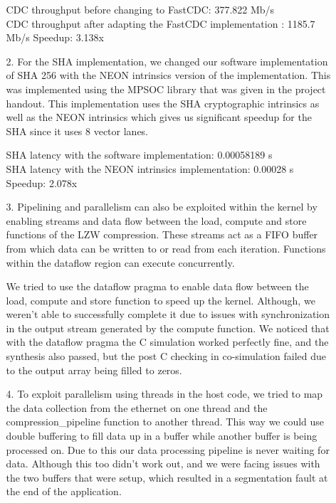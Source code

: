 \documentclass[../main.tex]{subfiles}
\begin{document}
\begin{enumerate}
\begin{enumerate}
        CDC throughput before changing to FastCDC: 377.822 Mb/s \\
        CDC throughput after adapting the FastCDC implementation : 1185.7 Mb/s
        Speedup: 3.138x

        \item[2.] For the SHA implementation, we changed our software implementation of SHA 256 with the NEON intrinsics version of the implementation. This was implemented using the MPSOC library that was given in the project handout. This implementation uses the SHA cryptographic intrinsics as well as the NEON intrinsics which gives us significant speedup for the SHA since it uses 8 vector lanes. 

        SHA latency with the software implementation: 0.00058189 s \\
        SHA latency with the NEON intrinsics implementation: 0.00028 s \\
        Speedup: 2.078x

        \item[3.] Pipelining and parallelism can also be exploited within the kernel by enabling streams and data flow between the load, compute and store functions of the LZW compression. These streams act as a FIFO buffer from which data can be written to or read from each iteration. Functions within the dataflow region can execute concurrently. 

        We tried to use the dataflow pragma to enable data flow between the load, compute and store function to speed up the kernel. Although, we weren’t able to successfully complete it due to issues with synchronization in the output stream generated by the compute function. We noticed that with the dataflow pragma the C simulation worked perfectly fine, and the synthesis also passed, but the post C checking in co-simulation failed due to the output array being filled to zeros. 

        \item[4.] To exploit parallelism using threads in the host code, we tried to map the data collection from the ethernet on one thread and the compression\_pipeline function to another thread. This way we could use double buffering to fill data up in a buffer while another buffer is being processed on. Due to this our data processing pipeline is never waiting for data. Although this too didn’t work out, and we were facing issues with the two buffers that were setup, which resulted in a segmentation fault at the end of the application.
 

\end{enumerate}
\end{enumerate}
\end{document}
